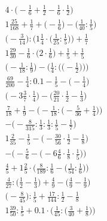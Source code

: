 \documentclass[8pt]{article}
\begin{document}
\begin{align}
4 \cdot \big(-\frac{1}{6} + \frac{1}{2} - \frac{1}{6} \cdot \frac{1}{2}\big) \\
1\frac{25}{168} + \frac{1}{7} + \big(-\frac{1}{6}\big) - \big(\frac{1}{40} : \frac{1}{5}\big) \\
\Big(-\frac{3}{14}\Big) : \Big(1\frac{1}{4} \cdot \big(\frac{1}{25} : \frac{1}{5}\big)\Big) + \frac{1}{7} \\
1\frac{29}{30} - \frac{1}{6} \cdot \big(2 \cdot \frac{1}{6}\big) + \frac{1}{5} + \frac{1}{5} \\
\bigg(-\frac{1}{18} : \frac{1}{9}\bigg) - \bigg(\frac{1}{4} : \Big(\big(-\frac{1}{2}\big)\Big)\bigg) \\
\frac{69}{200} - \frac{1}{4} : 0.1 - \frac{1}{5} - \big(-\frac{1}{4}\big) \\
\big(-3\frac{3}{7} \cdot \frac{1}{4}\big) - \big(\frac{20}{21} \cdot \frac{1}{2} - \frac{1}{3}\big) \\
\frac{7}{18} + \frac{1}{9} - \Big(-\frac{1}{18} : \big(-\frac{5}{36} + \frac{1}{4}\big)\Big) \\
-\big(-\frac{8}{315} : \frac{1}{3} : \frac{1}{3} : \frac{1}{5} - \frac{1}{7}\big) \\
1\frac{2}{35} - \frac{1}{5} - \big(-\frac{30}{56} \cdot \frac{1}{2} - \frac{1}{8}\big) \\
-\Big(-\frac{5}{6} - \big(-6\frac{4}{6} \cdot \frac{1}{8} \cdot \frac{1}{5}\big)\Big) \\
\frac{4}{5} + 1\frac{2}{5} \cdot \Big(\frac{8}{189} : \frac{1}{6} - \big(\frac{1}{54} : \frac{1}{6}\big)\Big) \\
\frac{4}{27} : \big(\frac{1}{2} - \frac{1}{3}\big) + \frac{4}{9} - \big(\frac{4}{9} - \frac{1}{9}\big) \\
\big(-\frac{8}{45}\big) : \frac{1}{5} + \frac{17}{144} : \frac{1}{2} - \frac{1}{8} \\
1\frac{39}{50} : \frac{1}{5} + 0.1 \cdot \Big(\frac{1}{45} : \big(\frac{3}{40} + \frac{1}{8}\big)\Big)
\end{align}
\end{document}
